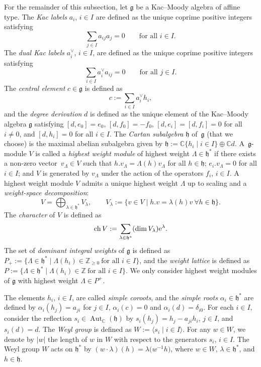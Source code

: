 \documentclass[pdftex]{sigma}
\numberwithin{equation}{section}
\theoremstyle{definition}
\newcommand{\C}{\mathbb{C}}
\begin{document}
For the remainder of this subsection, let $\mathfrak{g}$ be a Kac--Moody algebra of affine type. The \emph{Kac labels} $a_i$, $i\in I$ are defined as the unique coprime positive integers satisfying
\[
\sum_{j\in I} a_{ij} a_j = 0 \qquad\text{for all } i\in I.
\]
The \emph{dual Kac labels} $a_i^\vee$, $i\in I$, are defined as the unique coprime positive integers satisfying
\[
\sum_{i\in I} a_i^\vee a_{ij} = 0 \qquad\text{for all } j\in I.
\]
The \emph{central element} $c\in\mathfrak{g}$ is defined as
\[
c := \sum_{i\in I} a_i^\vee h_i,
\]
and the \emph{degree derivation} $d$ is defined as the unique element of the Kac--Moody algebra $\mathfrak g$ satisfying ${[d,e_0]=e_0}$, ${[d,f_0]=-f_0}$, ${[d,e_i]=[d,f_i]=0}$ for all $i\neq 0$, and $[d,h_i]=0$ for all $i\in I$. The \emph{Cartan subalgebra} $\mathfrak{h}$ of~$\mathfrak{g}$ (that we choose) is the maximal abelian subalgebra given by $\mathfrak{h} := \C \{h_i \mid i\in I\} \oplus \C d$.
A~$ \mathfrak g$-module $V$ is called a \emph{highest weight module} of highest weight $\Lambda\in\mathfrak h^{*}$ if there exists a non-zero vector~$v_\Lambda\in V$ such that $h.v_\Lambda = \Lambda(h)v_\Lambda$ for all $h\in \mathfrak{h}$; $e_i.v_\Lambda = 0$ for all $i \in I$; and $V$ is generated by $v_\Lambda$ under the action of the operators $f_i$, $i\in I$. A highest weight module $V$ admits a unique highest weight $\Lambda$ up to scaling and a \emph{weight-space decomposition}:
\[
V = \bigoplus_{\lambda \in \mathfrak{h}^*} V_\lambda,\qquad V_\lambda := \{v \in V \mid h.v = \lambda(h)v\ \forall h \in \mathfrak{h} \}.
\]
The \emph{character} of $V$ is defined as
\[\operatorname{ch} V := \sum_{\lambda \in \mathfrak{h}^*}(\dim V_\lambda) {\rm e}^\lambda.\]
The set of \emph{dominant integral weights} of $\mathfrak{g}$ is defined as $P_{+} := \{\Lambda\in\mathfrak h^{*} \mid \Lambda(h_i)\in\mathbb{Z}_{\ge0}\ \text{for all } i\in I\}$, and the \emph{weight lattice} is defined as $P := \{\Lambda\in\mathfrak h^{*} \mid \Lambda(h_i)\in\mathbb{Z}\ \text{for all } i\in I\}$. We only consider highest weight modules of $\mathfrak{g}$ with highest weight $\Lambda\in P^+$.

The elements $h_i$, $i\in I$, are called \emph{simple coroots}, and the \emph{simple roots} $\alpha_i\in\mathfrak h^*$ are defined by $\alpha_i(h_j)=a_{ji}$ for $j\in I$, $\alpha_i(c)=0$ and $\alpha_i(d)=\delta_{i0}$. For each $i\in I$, consider the reflection $s_i\in\operatorname{Aut}_{\mathbb C}(\mathfrak h)$ by $s_i(h_j)=h_j-a_{ji}h_i$, $j\in I$, and $s_i(d)=d$. The \emph{Weyl group} is defined as $W:=\langle s_i \mid i\in I \rangle$.
For any $w\in W$, we denote by $|w|$ the length of $w$ in $W$ with respect to the generators $s_i$, $i\in I$. The Weyl group $W$ acts on $\mathfrak h^{*}$ by $(w\cdot\lambda)(h)=\lambda\bigl(w^{-1}h\bigr)$, where $w\in W$, $\lambda\in\mathfrak h^{*}$, and $h\in\mathfrak h$.
\end{document}
